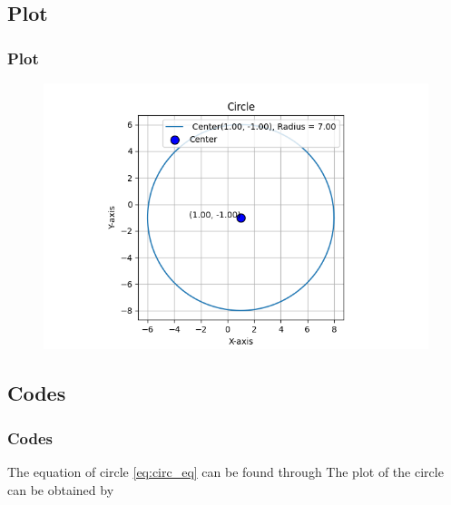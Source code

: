 \documentclass{beamer}
\theoremstyle{remark}
\numberwithin{equation}{section}
\begin{document}
\subsection{Plot}
\begin{frame}
    \frametitle{Plot}
\begin{figure}[h!]
   \centering
   \includegraphics[width=0.9\linewidth]{figs/circle.png}
   \end{figure}
\end{frame}
\subsection{Codes}
\begin{frame}
    \frametitle{Codes}
    The equation of circle \eqref{eq:circ_eq} can be found through
    The plot of the circle can be obtained by
    \end{frame}
\end{document}
